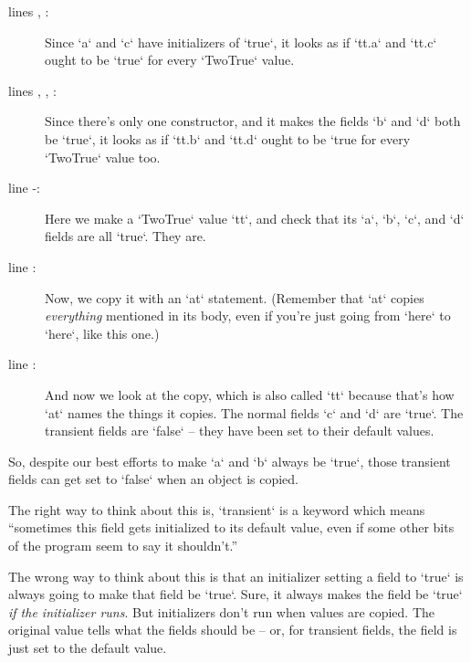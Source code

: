 \begin{description}
\item [lines , :] 
      Since \xcd`a` and \xcd`c` have initializers of \xcd`true`, it looks as
      if \xcd`tt.a` and \xcd`tt.c` ought to be \xcd`true` for every
      \xcd`TwoTrue` value.  
\item [lines , , :]
      Since there's only one constructor, and it makes the fields \xcd`b` and
      \xcd`d` both be \xcd`true`, it looks as if \xcd`tt.b` and \xcd`tt.d`
      ought to be \xcd`true for every \xcd`TwoTrue` value too.

\item [line -:] Here we make a \xcd`TwoTrue` value
      \xcd`tt`, and check that its \xcd`a`, \xcd`b`, \xcd`c`, and \xcd`d`
      fields are all \xcd`true`. They are.

\item [line :] Now, we copy it with an \xcd`at`
      statement.  (Remember that \xcd`at` copies {\em everything} mentioned in
      its body, even if you're just going from \xcd`here` to \xcd`here`, like
      this one.)

\item [line :] And now we look at the copy, which
      is also called \xcd`tt` because that's how \xcd`at` names the things it
      copies.  The normal fields \xcd`c` and \xcd`d` are \xcd`true`.  The
      transient fields are \xcd`false` -- they have been set to their default
      values.  
\end{description}

So, despite our best efforts to make \xcd`a` and \xcd`b` always be \xcd`true`,
those transient fields can get set to \xcd`false` when an object is copied.  

The right way to think about this is, \xcd`transient` is a keyword which means
``sometimes this field gets initialized to its default value, even if some
other bits of the program seem to say it shouldn't.''

The wrong way to think about this is that an initializer setting a field to
\xcd`true` is always going to make that field be \xcd`true`.  Sure, it always
makes the field be \xcd`true` {\em if the initializer runs}.  But initializers
don't run when values are copied.  The original value tells what the fields
should be -- or, for transient fields, the field is just set to the default
value.

